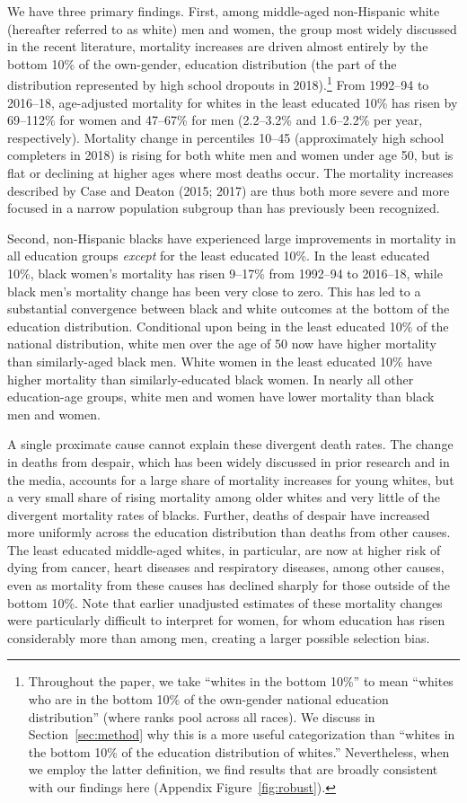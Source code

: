 \documentclass[12pt,letterpaper]{article}
\numberwithin{equation}{section}
\begin{document}
We have three primary findings. First, among middle-aged non-Hispanic
white (hereafter referred to as white) men and women, the group most
widely discussed in the recent literature, mortality increases are
driven almost entirely by the bottom 10\% of the own-gender, education
distribution (the part of the distribution represented by high school
dropouts in 2018).\footnote{Throughout the paper, we take ``whites in
  the bottom 10\%'' to mean ``whites who are in the bottom 10\% of the
  own-gender national education distribution'' (where ranks pool
  across all races). We discuss in Section~\ref{sec:method} why this
  is a more useful categorization than ``whites in the bottom 10\% of
  the education distribution of whites.'' Nevertheless, when we employ
  the latter definition, we find results that are broadly consistent
  with our findings here (Appendix Figure~\ref{fig:robust}).} From
1992--94 to 2016--18, age-adjusted mortality for whites in the least
educated 10\% has risen by 69--112\% for women and 47--67\% for men
(2.2--3.2\% and 1.6--2.2\% per year, respectively). Mortality change in percentiles 10--45 (approximately high school completers in 2018) is rising for both white men and women under age 50, but is flat or declining at higher ages where most deaths occur. The mortality increases described by Case and Deaton (2015; 2017) are thus both more severe and more focused in a narrow population subgroup than has previously been recognized.

Second, non-Hispanic blacks have experienced large improvements in mortality in all education groups \textit{except} for the least educated 10\%. In the least educated 10\%, black women's mortality has risen 9--17\% from 1992--94 to 2016--18, while black men's mortality change has been very close to zero. This has led to a substantial convergence between black and white outcomes at the bottom of the education distribution. Conditional upon being in the least educated 10\% of the national distribution, white men over the age of 50 now have higher mortality than similarly-aged black men. White women in the least educated 10\% have higher mortality than similarly-educated black women. In nearly all other education-age groups, white men and women have lower mortality than black men and women.

A single proximate cause cannot explain these divergent death
rates. The change in deaths from despair, which has been widely
discussed in prior research and in the media, accounts for a large
share of mortality increases for young whites, but a very small share
of rising mortality among older whites and very little of the
divergent mortality rates of blacks. Further, deaths of despair have
increased more uniformly across the education distribution than deaths
from other causes. The least educated middle-aged whites, in
particular, are now at higher risk of dying from cancer, heart
diseases and respiratory diseases, among other causes, even as
mortality from these causes has declined sharply for those outside of
the bottom 10\%. Note that earlier unadjusted estimates of these
mortality changes were particularly difficult to interpret for women,
for whom education has risen considerably more than among men,
creating a larger possible selection bias.
\end{document}
